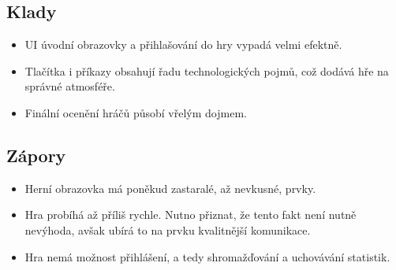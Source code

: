 \subsection*{Klady}

\begin{itemize}
    \item UI úvodní obrazovky a přihlašování do hry vypadá velmi efektně.
    \item Tlačítka i příkazy obsahují řadu technologických pojmů,
    což dodává hře na správné atmosféře.
    \item Finální ocenění hráčů působí vřelým dojmem.
\end{itemize}

\subsection*{Zápory}

\begin{itemize}
    \item Herní obrazovka má poněkud zastaralé, až nevkusné, prvky.
    \item Hra probíhá až příliš rychle.
    Nutno přiznat, že tento fakt není nutně nevýhoda,
    avšak ubírá to na prvku kvalitnější komunikace.
    \item Hra nemá možnost přihlášení,
    a tedy shromažďování a uchovávání statistik.
\end{itemize}
